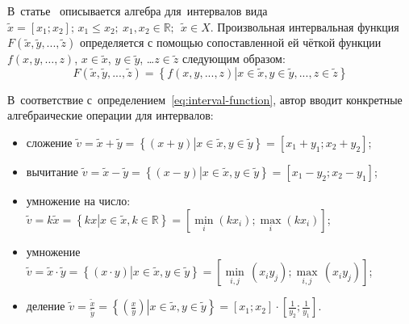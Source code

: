 В~статье~\cite{Levin} описывается алгебра для~интервалов вида $\tilde{x}=\left[ {{x}_{1}};{{x}_{2}} \right];\,{{x}_{1}}\le {{x}_{2}};\ x_1, x_2\in \mathbb{R};\ \ \tilde{x}\in X$. Произвольная интервальная функция $F\left( \tilde{x},\tilde{y},...,\tilde{z} \right)$ определяется с помощью сопоставленной ей чёткой функции $f\left( x,y,\ldots,z \right)$, $x\in \tilde{x}$, $y\in \tilde{y}$, …$z\in \tilde{z}$ следующим образом:
\begin{equation}
\label{eq:interval-function}
	F\left( \tilde{x},\tilde{y},...,\tilde{z} \right)=\left\{ f\left( x,y,...,z \right)\left| x\in \tilde{x},y\in \tilde{y},...,z\in \tilde{z} \right. \right\}
\end{equation}

В~соответствие с~определением~\eqref{eq:interval-function}, автор вводит конкретные алгебраические операции для интервалов:
\begin{itemize}
	\item сложение $\tilde{v}=\tilde{x}+\tilde{y}=\left\{ \left( x+y \right)\left| x\in \tilde{x},y\in \tilde{y} \right. \right\}=\left[ {{x}_{1}}+{{y}_{1}};{{x}_{2}}+{{y}_{2}} \right]$;
	\item вычитание $\tilde{v}=\tilde{x}-\tilde{y}=\left\{ \left( x-y \right)\left| x\in \tilde{x},y\in \tilde{y} \right. \right\}=\left[ {{x}_{1}}-{{y}_{2}};{{x}_{2}}-{{y}_{1}} \right]$;
	\item умножение на число: $\tilde{v}=k\tilde{x}=\left\{ kx\left| x\in \tilde{x},k\in \mathbb{R} \right. \right\}=\left[\underset{i}{\mathop {\min}} \left( kx_i \right); \underset{i}{\mathop {\max}} \left( kx_i \right) \right]$;
	
	\item умножение $\tilde{v}=\tilde{x}\cdot \tilde{y}=\left\{ \left( x\cdot y \right)\left| x\in \tilde{x},y\in \tilde{y} \right. \right\}=\left[ \underset{i,j}{\mathop{\min }}\,\left( {{x}_{i}}{{y}_{j}} \right);\underset{i,j}{\mathop{\max }}\,\left( {{x}_{i}}{{y}_{j}} \right) \right]$;
	\item деление $\displaystyle \tilde{v}=\frac{\tilde x}{\tilde y}=\left\{ \left. \left( \frac{x}{y} \right) \right|x\in \tilde{x},y\in \tilde{y} \right\}=\left[ {{x}_{1}};{{x}_{2}} \right]\cdot \left[ \frac{1}{{{y}_{2}}};\frac{1}{{{y}_{1}}} \right]$.
\end{itemize}

